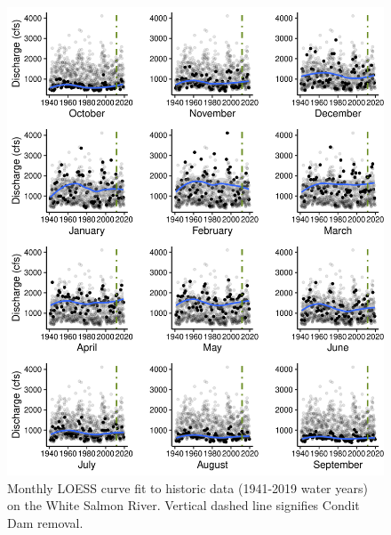 \documentclass[
  12pt,
]{article}
\begin{document}
\begin{figure}
\centering
\includegraphics{WhiteSalmon_WriteUp_files/figure-latex/fig8-1.pdf}
\caption{Monthly LOESS curve fit to historic data (1941-2019 water
years) on the White Salmon River. Vertical dashed line signifies Condit
Dam removal.}
\end{figure}
\end{document}
